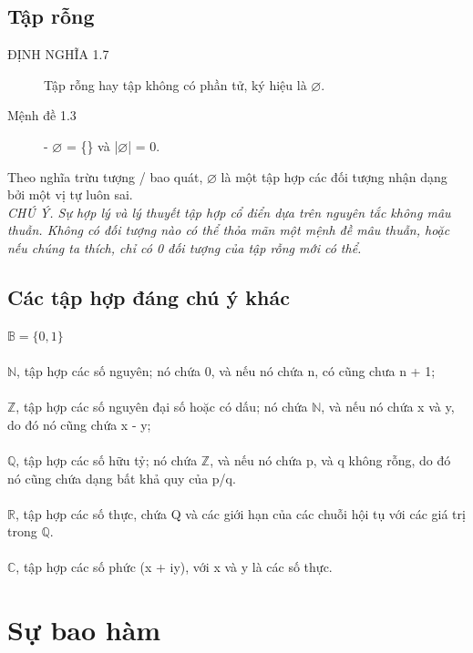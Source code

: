 \documentclass[11pt,a4paper]{report}
\begin{document}
\subsection{Tập rỗng}
\begin{description}
	\item [ĐỊNH NGHĨA 1.7] Tập rỗng hay tập không có phần tử, ký hiệu là $\varnothing$.
\end{description}
\begin{description}
	\item[Mệnh đề 1.3] - $\varnothing$ = \{\} và |$\varnothing$| = 0.
\end{description}
Theo nghĩa trừu tượng / bao quát, $\varnothing$ là một tập hợp các đối tượng nhận dạng bởi một vị tự luôn sai.\\
\textit{CHÚ Ý. Sự hợp lý và lý thuyết tập hợp cổ điển dựa trên nguyên tắc không mâu thuẫn. Không có đối tượng nào có thể thỏa mãn một mệnh đề mâu thuẫn, hoặc nếu chúng ta thích, chỉ có 0 đối tượng của tập rỗng mới có thể.}
\subsection{Các tập hợp đáng chú ý khác}
$\mathbb{B} = \{0, 1\}$\\
\\
$\mathbb{N}$,  tập hợp các số nguyên; nó chứa 0, và nếu nó chứa n, có cũng chưa n + 1;\\
\\
$\mathbb{Z}$, tập hợp các số nguyên đại số hoặc có dấu; nó chứa $\mathbb{N}$, và nếu nó chứa x và y, do đó nó cũng chứa x - y;\\
\\
$\mathbb{Q}$, tập hợp các số hữu tỷ; nó chứa $\mathbb{Z}$, và nếu nó chứa p, và q không rỗng, do đó nó cũng chứa dạng bất khả quy của p/q.\\
\\
$\mathbb{R}$, tập hợp các số thực, chứa Q và các giới hạn của các chuỗi hội tụ với các giá trị trong $\mathbb{Q}$.\\
\\
$\mathbb{C}$, tập hợp các số phức (x + iy), với x và y là các số thực.
\section{Sự bao hàm}
\end{document}
